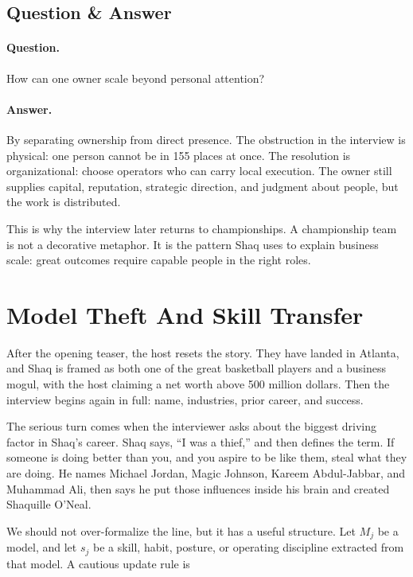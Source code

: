 \subsection{Question \& Answer}

\paragraph{Question.}
How can one owner scale beyond personal attention?

\paragraph{Answer.}
By separating ownership from direct presence. The obstruction in the interview is physical: one person cannot be in 155 places at once. The resolution is organizational: choose operators who can carry local execution. The owner still supplies capital, reputation, strategic direction, and judgment about people, but the work is distributed.

This is why the interview later returns to championships. A championship team is not a decorative metaphor. It is the pattern Shaq uses to explain business scale: great outcomes require capable people in the right roles.

\section{Model Theft And Skill Transfer}

After the opening teaser, the host resets the story. They have landed in Atlanta, and Shaq is framed as both one of the great basketball players and a business mogul, with the host claiming a net worth above 500 million dollars. Then the interview begins again in full: name, industries, prior career, and success.

The serious turn comes when the interviewer asks about the biggest driving factor in Shaq's career. Shaq says, ``I was a thief,'' and then defines the term. If someone is doing better than you, and you aspire to be like them, steal what they are doing. He names Michael Jordan, Magic Johnson, Kareem Abdul-Jabbar, and Muhammad Ali, then says he put those influences inside his brain and created Shaquille O'Neal.

We should not over-formalize the line, but it has a useful structure. Let \(M_j\) be a model, and let \(s_j\) be a skill, habit, posture, or operating discipline extracted from that model. A cautious update rule is

